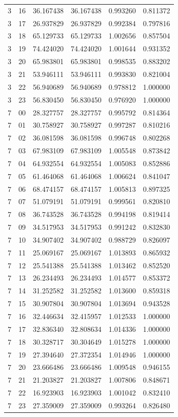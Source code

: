 \documentclass[10pt,journal,onecolumn]{IEEEtran}
\begin{document}
\begin{longtable}{rrrrrr}
3 & 16 & 36.167438 & 36.167438 & 0.993260 & 0.811372\\
3 & 17 & 26.937829 & 26.937829 & 0.992384 & 0.797816\\
3 & 18 & 65.129733 & 65.129733 & 1.002656 & 0.857504\\
3 & 19 & 74.424020 & 74.424020 & 1.001644 & 0.931352\\
3 & 20 & 65.983801 & 65.983801 & 0.998535 & 0.883202\\
3 & 21 & 53.946111 & 53.946111 & 0.993830 & 0.821004\\
3 & 22 & 56.940689 & 56.940689 & 0.978812 & 1.000000\\
3 & 23 & 56.830450 & 56.830450 & 0.976920 & 1.000000\\
7 & 00 & 28.327757 & 28.327757 & 0.995792 & 0.814364\\
7 & 01 & 30.758927 & 30.758927 & 0.997287 & 0.810216\\
7 & 02 & 36.081598 & 36.081598 & 0.996748 & 0.802268\\
7 & 03 & 67.983109 & 67.983109 & 1.005548 & 0.873842\\
7 & 04 & 64.932554 & 64.932554 & 1.005083 & 0.852886\\
7 & 05 & 61.464068 & 61.464068 & 1.006624 & 0.841047\\
7 & 06 & 68.474157 & 68.474157 & 1.005813 & 0.897325\\
7 & 07 & 51.079191 & 51.079191 & 0.999561 & 0.820810\\
7 & 08 & 36.743528 & 36.743528 & 0.994198 & 0.819414\\
7 & 09 & 34.517953 & 34.517953 & 0.991242 & 0.832830\\
7 & 10 & 34.907402 & 34.907402 & 0.988729 & 0.826097\\
7 & 11 & 25.069167 & 25.069167 & 1.013893 & 0.865932\\
7 & 12 & 25.541388 & 25.541388 & 1.013462 & 0.852520\\
7 & 13 & 26.234493 & 26.234493 & 1.014577 & 0.853372\\
7 & 14 & 31.252582 & 31.252582 & 1.013600 & 0.859318\\
7 & 15 & 30.907804 & 30.907804 & 1.013694 & 0.943528\\
7 & 16 & 32.446634 & 32.415957 & 1.012533 & 1.000000\\
7 & 17 & 32.836340 & 32.808634 & 1.014336 & 1.000000\\
7 & 18 & 30.328717 & 30.304649 & 1.015278 & 1.000000\\
7 & 19 & 27.394640 & 27.372354 & 1.014946 & 1.000000\\
7 & 20 & 23.666486 & 23.666486 & 1.009548 & 0.946155\\
7 & 21 & 21.203827 & 21.203827 & 1.007806 & 0.848671\\
7 & 22 & 16.923903 & 16.923903 & 1.001042 & 0.832410\\
7 & 23 & 27.359009 & 27.359009 & 0.993264 & 0.826480\\
\bottomrule
\end{longtable}
\normalsize
\end{document}
